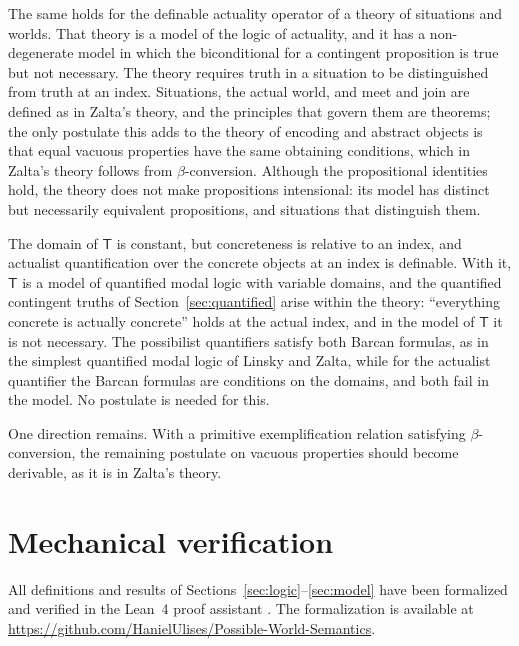 \documentclass[11pt]{amsart}
\theoremstyle{plain}
\theoremstyle{definition}
\theoremstyle{remark}
\newcommand{\T}{\mathsf{T}}
\begin{document}
The same holds for the definable actuality operator of a theory of
situations and worlds. That theory is a model of the logic of
actuality, and it has a non-degenerate model in which the biconditional
for a contingent proposition is true but not necessary. The theory
requires truth in a situation to be distinguished from truth at an
index. Situations, the actual world, and meet and join are defined as
in Zalta's theory, and the principles that govern them are theorems;
the only postulate this adds to the theory of encoding and abstract
objects is that equal vacuous properties have the same obtaining
conditions, which in Zalta's theory follows from $\beta$-conversion.
Although the propositional identities hold, the theory does not make
propositions intensional: its model has distinct but necessarily
equivalent propositions, and situations that distinguish them.

The domain of $\T$ is constant, but concreteness is relative to an
index, and actualist quantification over the concrete objects at an
index is definable. With it, $\T$ is a model of quantified modal logic
with variable domains, and the quantified contingent truths of
Section~\ref{sec:quantified} arise within the theory: ``everything
concrete is actually concrete'' holds at the actual index, and in the
model of $\T$ it is not necessary. The possibilist quantifiers satisfy
both Barcan formulas, as in the simplest quantified modal logic of
Linsky and Zalta, while for the actualist quantifier the Barcan
formulas are conditions on the domains, and both fail in the model. No
postulate is needed for this.

One direction remains. With a primitive exemplification relation
satisfying $\beta$-conversion, the remaining postulate on vacuous
properties should become derivable, as it is in Zalta's theory.

\appendix

\section{Mechanical verification}
\label{app:mech}

All definitions and results of
Sections~\ref{sec:logic}--\ref{sec:model} have been formalized and
verified in the Lean~4 proof assistant \cite{demoura2021}. The
formalization is available at
\url{https://github.com/HanielUlises/Possible-World-Semantics}.
\end{document}
